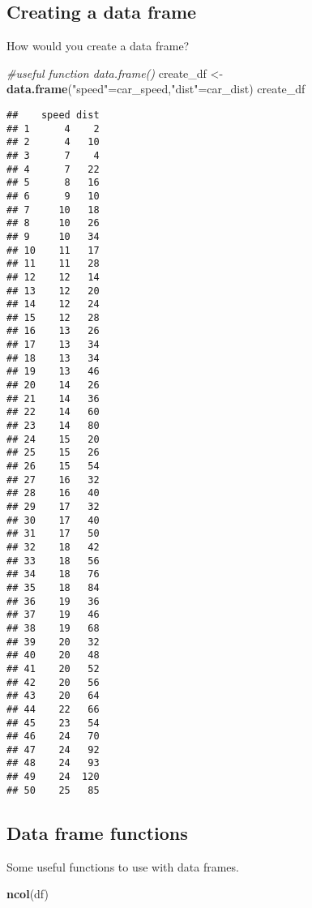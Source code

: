 \documentclass[
]{article}
\newenvironment{Shaded}{\begin{snugshade}}{\end{snugshade}}
\newcommand{\CommentTok}[1]{\textcolor[rgb]{0.56,0.35,0.01}{\textit{#1}}}
\newcommand{\FunctionTok}[1]{\textcolor[rgb]{0.13,0.29,0.53}{\textbf{#1}}}
\newcommand{\NormalTok}[1]{#1}
\newcommand{\OtherTok}[1]{\textcolor[rgb]{0.56,0.35,0.01}{#1}}
\newcommand{\StringTok}[1]{\textcolor[rgb]{0.31,0.60,0.02}{#1}}
\begin{document}
\hypertarget{creating-a-data-frame}{%
\subsection{Creating a data frame}\label{creating-a-data-frame}}

How would you create a data frame?

\begin{Shaded}
\begin{Highlighting}[]
\CommentTok{\#useful function data.frame()}
\NormalTok{create\_df }\OtherTok{\textless{}{-}} \FunctionTok{data.frame}\NormalTok{(}\StringTok{"speed"}\OtherTok{=}\NormalTok{car\_speed,}\StringTok{"dist"}\OtherTok{=}\NormalTok{car\_dist)}
\NormalTok{create\_df}
\end{Highlighting}
\end{Shaded}

\begin{verbatim}
##    speed dist
## 1      4    2
## 2      4   10
## 3      7    4
## 4      7   22
## 5      8   16
## 6      9   10
## 7     10   18
## 8     10   26
## 9     10   34
## 10    11   17
## 11    11   28
## 12    12   14
## 13    12   20
## 14    12   24
## 15    12   28
## 16    13   26
## 17    13   34
## 18    13   34
## 19    13   46
## 20    14   26
## 21    14   36
## 22    14   60
## 23    14   80
## 24    15   20
## 25    15   26
## 26    15   54
## 27    16   32
## 28    16   40
## 29    17   32
## 30    17   40
## 31    17   50
## 32    18   42
## 33    18   56
## 34    18   76
## 35    18   84
## 36    19   36
## 37    19   46
## 38    19   68
## 39    20   32
## 40    20   48
## 41    20   52
## 42    20   56
## 43    20   64
## 44    22   66
## 45    23   54
## 46    24   70
## 47    24   92
## 48    24   93
## 49    24  120
## 50    25   85
\end{verbatim}

\hypertarget{data-frame-functions}{%
\subsection{Data frame functions}\label{data-frame-functions}}

Some useful functions to use with data frames.

\begin{Shaded}
\begin{Highlighting}[]
\FunctionTok{ncol}\NormalTok{(df)  }
\end{Highlighting}
\end{Shaded}
\end{document}
